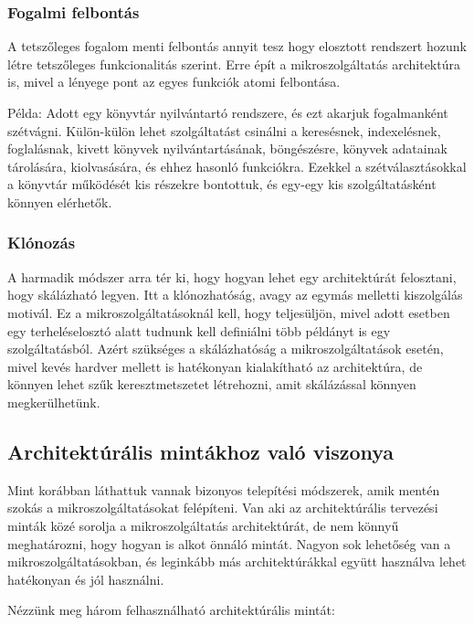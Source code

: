 \documentclass[11pt,magyar,a4paper,twoside,]{report}
\begin{document}
\subsubsection{Fogalmi felbontás}\label{fogalmi-felbontuxe1s}

A tetszőleges fogalom menti felbontás annyit tesz hogy elosztott
rendszert hozunk létre tetszőleges funkcionalitás szerint. Erre épít a
mikroszolgáltatás architektúra is, mivel a lényege pont az egyes
funkciók atomi felbontása.

Példa: Adott egy könyvtár nyilvántartó rendszere, és ezt akarjuk
fogalmanként szétvágni. Külön-külön lehet szolgáltatást csinálni a
keresésnek, indexelésnek, foglalásnak, kivett könyvek nyilvántartásának,
böngészésre, könyvek adatainak tárolására, kiolvasására, és ehhez
hasonló funkciókra. Ezekkel a szétválasztásokkal a könyvtár működését
kis részekre bontottuk, és egy-egy kis szolgáltatásként könnyen
elérhetők.

\subsubsection{Klónozás}\label{kluxf3nozuxe1s}

A harmadik módszer arra tér ki, hogy hogyan lehet egy architektúrát
felosztani, hogy skálázható legyen. Itt a klónozhatóság, avagy az egymás
melletti kiszolgálás motivál. Ez a mikroszolgáltatásoknál kell, hogy
teljesüljön, mivel adott esetben egy terheléselosztó alatt tudnunk kell
definiálni több példányt is egy szolgáltatásból. Azért szükséges a
skálázhatóság a mikroszolgáltatások esetén, mivel kevés hardver mellett
is hatékonyan kialakítható az architektúra, de könnyen lehet szűk
keresztmetszetet létrehozni, amit skálázással könnyen megkerülhetünk.

\subsection{Architektúrális mintákhoz való
viszonya}\label{architektuxfaruxe1lis-mintuxe1khoz-valuxf3-viszonya}

Mint korábban láthattuk vannak bizonyos telepítési módszerek, amik
mentén szokás a mikroszolgáltatásokat felépíteni. Van aki az
architektúrális tervezési minták közé sorolja a mikroszolgáltatás
architektúrát, de nem könnyű meghatározni, hogy hogyan is alkot önnáló
mintát. Nagyon sok lehetőség van a mikroszolgáltatásokban, és leginkább
más architektúrákkal együtt használva lehet hatékonyan és jól használni.

Nézzünk meg három felhasználható architektúrális mintát:
\end{document}
